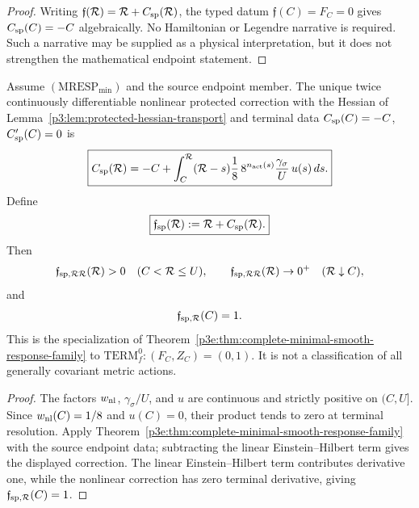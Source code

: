 \documentclass[12pt,a4paper]{article}
\begin{document}
\begin{proof}
Writing \(\mathfrak f(\mathcal R)=\mathcal R+C_{\rm sp}(\mathcal R)\), the typed datum
\(\mathfrak f(C)=F_C=0\) gives \(C_{\rm sp}(C)=-C\) algebraically.  No
Hamiltonian or Legendre narrative is required.  Such a narrative may be
supplied as a physical interpretation, but it does not strengthen the
mathematical endpoint statement.
\end{proof}

\begin{theorem}
\label{p3:thm:master-lagrangian}
Assume \((\mathrm{MRESP}_{\min})\) and the source endpoint member.  The unique twice continuously differentiable
nonlinear protected correction with the Hessian of
Lemma~\ref{p3:lem:protected-hessian-transport} and terminal data
\(C_{\rm sp}(C)=-C\), \(C_{\rm sp}'(C)=0\) is
\begin{equation}
\label{p3:eq:spectral-response-reconstruction}
 \boxed{
 C_{\rm sp}(\mathcal R)
 =-C+\int_C^{\mathcal R}(\mathcal R-s)
       \frac18\,8^{n_{\rm act}(s)}
       \frac{\gamma_\sigma}{U}\,u(s)\,ds .}
\end{equation}
Define
\[
 \boxed{\mathfrak f_{\rm sp}(\mathcal R):=\mathcal R+C_{\rm sp}(\mathcal R).}
\]
Then
\[
 \mathfrak f_{\rm sp,\mathcal R\mathcal R}(\mathcal R)>0
 \quad(C<\mathcal R\le U),
 \qquad
 \mathfrak f_{\rm sp,\mathcal R\mathcal R}(\mathcal R)\to0^+
 \quad(\mathcal R\downarrow C),
\]
and
\[
 \mathfrak f_{\rm sp,\mathcal R}(C)=1.
\]
This is the specialization of
Theorem~\ref{p3e:thm:complete-minimal-smooth-response-family} to
\(\mathrm{TERM}_f^0:(F_C,Z_C)=(0,1)\).  It is not a
classification of all generally covariant metric actions.
\end{theorem}

\begin{proof}
The factors \(w_{\rm nl}\), \(\gamma_\sigma/U\), and \(u\) are continuous and
strictly positive on \((C,U]\).  Since
\(w_{\rm nl}(C)=1/8\) and \(u(C)=0\), their product tends to zero at terminal
resolution.  Apply
Theorem~\ref{p3e:thm:complete-minimal-smooth-response-family} with the source
endpoint data; subtracting the linear Einstein--Hilbert term gives the
displayed correction.  The
linear Einstein--Hilbert term contributes derivative one, while the nonlinear
correction has zero terminal derivative, giving
\(\mathfrak f_{\rm sp,\mathcal R}(C)=1\).
\end{proof}
\end{document}
